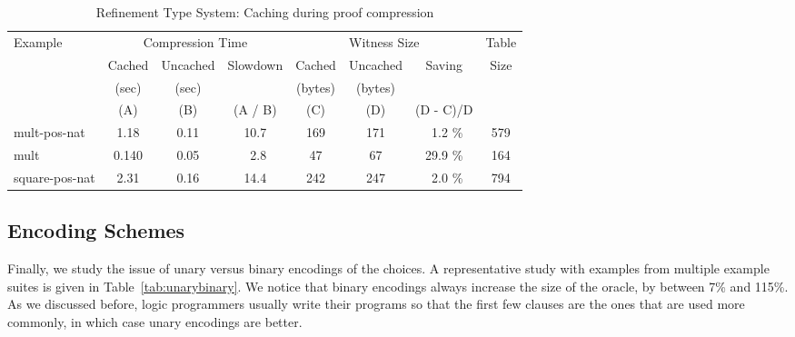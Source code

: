 \documentclass{llncs}
\begin{document}
\begin{table*}[htbp]
\begin{center}
\begin{small}
\begin{tabular}{|l|c|c|c|c|c|c|c|}
\hline
Example & \multicolumn{3}{c}{Compression Time} & 
\multicolumn{3}{c}{Witness Size} & Table\\
& Cached & Uncached & Slowdown & Cached & Uncached & Saving & Size\\
& (sec) & (sec) &  & (bytes) & (bytes) & & \\
& (A) & (B) & (A / B) & (C) & (D) & (D - C)/D &\\
\hline
mult-pos-nat & 1.18 & 0.11 & 10.7 & 169 & 171 & \ 1.2 \% & 579\\
mult & 0.140 & 0.05 & \ 2.8 & 47 & 67 & 29.9 \% & 164\\
square-pos-nat & 2.31 & 0.16 & 14.4 & 242 & 247 & \ 2.0 \% & 794\\
\hline
\end{tabular}
\end{small}
\end{center}
\caption{\label{tab:refcache} 
Refinement Type System: Caching during proof compression}
\end{table*}

\subsection{Encoding Schemes}
Finally, we study the issue of unary versus binary encodings of the choices.
A representative study with examples from multiple example suites is given
in Table~\ref{tab:unarybinary}. We notice that binary encodings always 
increase the size of the oracle, by between 7\% and 115\%. As we discussed
before, logic programmers usually write their programs so that the first
few clauses are the ones that are used more commonly, in which case unary 
encodings are better.
\end{document}
